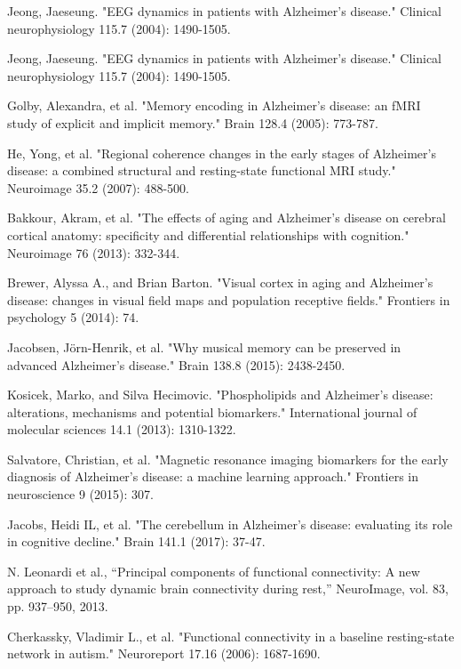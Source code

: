 \documentclass[preprint,12pt]{elsarticle}
\begin{document}
\begin{thebibliography}{1}
		Jeong, Jaeseung. "EEG dynamics in patients with Alzheimer's disease." Clinical neurophysiology 115.7 (2004): 1490-1505.
		
		Jeong, Jaeseung. "EEG dynamics in patients with Alzheimer's disease." Clinical neurophysiology 115.7 (2004): 1490-1505.
		
		Golby, Alexandra, et al. "Memory encoding in Alzheimer's disease: an fMRI study of explicit and implicit memory." Brain 128.4 (2005): 773-787.
		
		He, Yong, et al. "Regional coherence changes in the early stages of Alzheimer’s disease: a combined structural and resting-state functional MRI study." Neuroimage 35.2 (2007): 488-500.
		
		
		
		Bakkour, Akram, et al. "The effects of aging and Alzheimer's disease on cerebral cortical anatomy: specificity and differential relationships with cognition." Neuroimage 76 (2013): 332-344.
		
		Brewer, Alyssa A., and Brian Barton. "Visual cortex in aging and Alzheimer's disease: changes in visual field maps and population receptive fields." Frontiers in psychology 5 (2014): 74.
		
		Jacobsen, Jörn-Henrik, et al. "Why musical memory can be preserved in advanced Alzheimer’s disease." Brain 138.8 (2015): 2438-2450.
		
		Kosicek, Marko, and Silva Hecimovic. "Phospholipids and Alzheimer’s disease: alterations, mechanisms and potential biomarkers." International journal of molecular sciences 14.1 (2013): 1310-1322.
		
		Salvatore, Christian, et al. "Magnetic resonance imaging biomarkers for the early diagnosis of Alzheimer's disease: a machine learning approach." Frontiers in neuroscience 9 (2015): 307.
		
		
		Jacobs, Heidi IL, et al. "The cerebellum in Alzheimer’s disease: evaluating its role in cognitive decline." Brain 141.1 (2017): 37-47.
		
		N. Leonardi et al., “Principal components of functional connectivity: A
		new approach to study dynamic brain connectivity during rest,” NeuroImage,
		vol. 83, pp. 937–950, 2013.
		
		Cherkassky, Vladimir L., et al. "Functional connectivity in a baseline resting-state network in autism." Neuroreport 17.16 (2006): 1687-1690.
		

\end{thebibliography}
\end{document}
